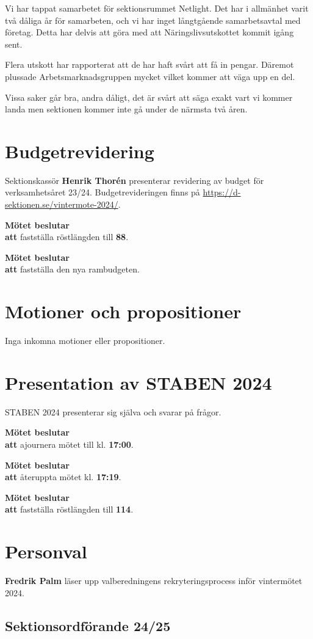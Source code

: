 \documentclass{datateknologsektionen-document}
\newcommand{\ind}{\hspace*{2em}}
\newcommand{\motetbeslutar}{\textbf{Mötet beslutar}}
\newcommand{\att}{\\\ind\textbf{att}}
\newcommand{\rostlangd}[1]{\motetbeslutar\att{} fastställa röstlängden till \textbf{#1}.}
\begin{document}
Vi har tappat samarbetet för sektionsrummet Netlight. Det har i allmänhet varit två dåliga år för samarbeten, och vi har inget långtgående samarbetsavtal med företag. Detta har delvis att göra med att Näringslivsutskottet kommit igång sent.

Flera utskott har rapporterat att de har haft svårt att få in pengar. Däremot plussade Arbetsmarknadsgruppen mycket vilket kommer att väga upp en del.

Vissa saker går bra, andra dåligt, det är svårt att säga exakt vart vi kommer landa men sektionen kommer inte gå under de närmsta två åren.

\section{Budgetrevidering}
Sektionskassör \textbf{Henrik Thorén} presenterar revidering av budget för verksamhetsåret 23/24. Budgetrevideringen finns på \url{https://d-sektionen.se/vintermote-2024/}.

\rostlangd{88}

\motetbeslutar\att{} fastställa den nya rambudgeten.


\section{Motioner och propositioner}

Inga inkomna motioner eller propositioner.


\section{Presentation av STABEN 2024}

STABEN 2024 presenterar sig själva och svarar på frågor.

\motetbeslutar\att{} ajournera mötet till kl. \textbf{17:00}.

\motetbeslutar\att{} återuppta mötet kl. \textbf{17:19}.

\rostlangd{114}

\pagebreak
\section{Personval}

\textbf{Fredrik Palm} läser upp valberedningens rekryteringsprocess inför vintermötet 2024.

\subsection{Sektionsordförande 24/25}
\end{document}
